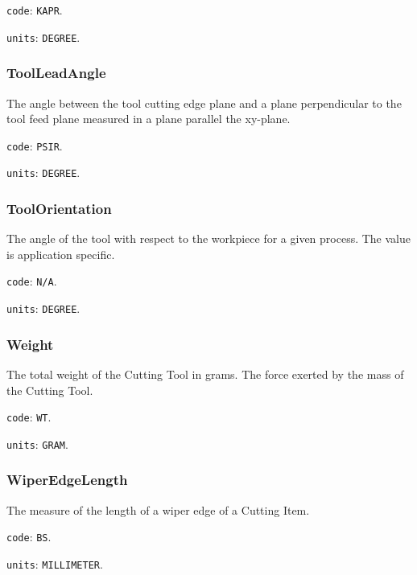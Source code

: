 \texttt{code}: \texttt{KAPR}.


\texttt{units}: \texttt{DEGREE}.



\subsubsection{ToolLeadAngle}
\label{sec:ToolLeadAngle}



The angle between the tool cutting edge plane and a plane perpendicular to the tool feed plane measured in a plane parallel the xy-plane.


\texttt{code}: \texttt{PSIR}.


\texttt{units}: \texttt{DEGREE}.



\subsubsection{ToolOrientation}
\label{sec:ToolOrientation}



The angle of the tool with respect to the workpiece for a given process. The value is application specific.


\texttt{code}: \texttt{N/A}.


\texttt{units}: \texttt{DEGREE}.



\subsubsection{Weight}




The total weight of the Cutting Tool in grams. The force exerted by the mass of the Cutting Tool.


\texttt{code}: \texttt{WT}.


\texttt{units}: \texttt{GRAM}.



\subsubsection{WiperEdgeLength}
\label{sec:WiperEdgeLength}



The measure of the length of a wiper edge of a Cutting Item.


\texttt{code}: \texttt{BS}.


\texttt{units}: \texttt{MILLIMETER}.


